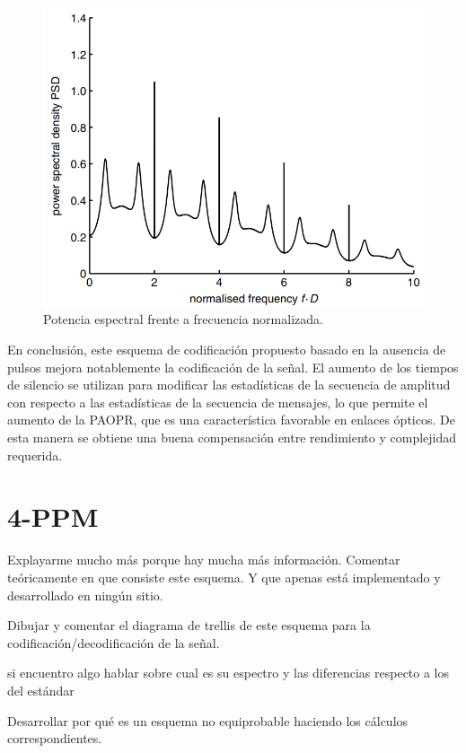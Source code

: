 \begin{figure}[ht]
    \centering
    \includegraphics[scale=0.5]{./figuras/psd_cancelacion.png}
    \caption{\small{Potencia espectral frente a frecuencia normalizada.}}
    \label{psd_cancelación}%
\end{figure}


En conclusión, este esquema de codificación propuesto basado en la ausencia de pulsos
mejora notablemente la codificación de la señal.
El aumento de los tiempos de silencio se utilizan para modificar las estadísticas de
la secuencia de amplitud con respecto a las estadísticas de la
secuencia de mensajes, lo que permite el aumento de la PAOPR,
que es una característica favorable en enlaces ópticos. De esta manera se 
obtiene una buena compensación entre rendimiento y complejidad requerida.

\section{4-PPM}
Explayarme mucho más porque hay mucha más información.
Comentar teóricamente en que consiste este esquema.
Y que apenas está implementado y desarrollado en ningún sitio.

Dibujar y comentar el diagrama de trellis de este esquema para la codificación/decodificación de la señal.

si encuentro algo hablar sobre cual es su espectro y las diferencias respecto a los del estándar

Desarrollar por qué es un esquema no equiprobable haciendo los cálculos correspondientes.

